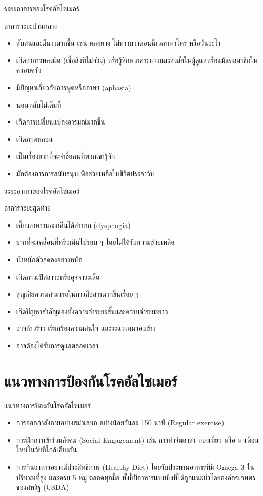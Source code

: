 \documentclass[xetex,serif]{beamer}
\begin{document}
\begin{frame}{ระยะอาการของโรคอัลไซเมอร์}

  {\Large อาการระยะปานกลาง}

  \begin{itemize}
    \item สับสนและมึนงงมากขึ้น เช่น หลงทาง ไม่ทราบว่าตอนนี้เวลาเท่าไหร่ หรือวันอะไร 
    \item เกิดอาการหลงผิด (เชื่อสิ่งที่ไม่จริง)  หรือรู้สึกหวาดระแวงและสงสัยในผู้ดูแลหรือแม้แต่สมาชิกในครอบครัว 
    \item มีปัญหาเกี่ยวกับการพูดหรือภาษา (aphasia) 
    \item นอนหลับไม่เต็มที่ 
    \item เกิดการเปลี่ยนแปลงอารมณ์มากขึ้น 
    \item เกิดภาพหลอน 
    \item เป็นเรื่องยากที่จะจำชื่อคนที่พวกเขารู้จัก 
    \item มักต้องการการสนับสนุนเพื่อช่วยเหลือในชีวิตประจำวัน
  \end{itemize}
\end{frame}

\begin{frame}{ระยะอาการของโรคอัลไซเมอร์}

  {\Large อาการระยะสุดท้าย}

  \begin{itemize}
    \item เคี้ยวอาหารและกลืนได้ลำบาก (dysphagia)
    \item ยากที่จะเคลื่อนที่หรือเดินไปรอบ ๆ โดยไม่ได้รับความช่วยเหลือ
    \item น้ำหนักตัวลดลงอย่างหนัก
    \item เกิดภาวะปัสสาวะหรืออุจจาระเล็ด
    \item สูญเสียความสามารถในการสื่อสารมากขึ้นเรื่อย ๆ
    \item เกิดปัญหาสำคัญของทั้งความจำระยะสั้นและความจำระยะยาว
    \item อาจก้าวร้าว เรียกร้องความสนใจ และระแวงคนรอบข้าง
    \item อาจต้องได้รับการดูแลตลอดเวลา
  \end{itemize}
\end{frame}

\section{แนวทางการป้องกันโรคอัลไซเมอร์}

\begin{frame}{แนวทางการป้องกันโรคอัลไซเมอร์}
  \begin{itemize}
    \item การออกกําลังกายอย่างสมําเสมอ อย่างน้อยวันละ 150 นาที (Regular exercise) 
    \item การฝึกการเข้าร่วมสังคม (Social Engagement) เช่น การทําจิตอาสา ท่องเที่ยว หรือ หาเพื่อนใหม่ในวัยที่ใกล้เคียงกัน
    \item  การกินอาหารอย่างมีประสิทธิภาพ (Healthy Diet)  โดยรับประทานอาหารที่มี Omega 3 ในปริมาณที่สูง และครบ 5 หมู่ ตลอดทุกมื้อ ทั้งนี้มีอาหารเเบบนึงที่ได้ถูกเเนะนําโดยองค์กรเกษตรของสหรัฐ (USDA)
  \end{itemize}
\end{frame}
\end{document}
